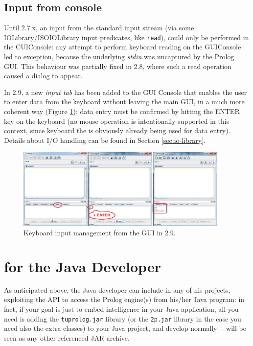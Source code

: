 \subsection{Input from console}
\label{ssec:input-from-console}

Until \tuprolog{} 2.7.x, an input from the standard input stream (via some IOLibrary/ISOIOLibrary input predicates, like \texttt{read}), could only be performed in the CUIConsole: any attempt to perform keyboard reading on the GUIConsole led to exception, because the underlying \emph{stdin} was uncaptured by the Prolog GUI.
This behaviour was partially fixed in \tuprolog{} 2.8, where such a read operation caused a dialog to appear. 

In \tuprolog{} 2.9, a new \textit{input tab} has been added to the GUI Console that enables the user to enter data from the keyboard without leaving the main GUI, in a much more coherent way (Figure \ref{fig:gui-InputFromConsole}): data entry must be confirmed by hitting the ENTER key on the keyboard (no mouse operation is intentionally supported in this context, since keyboard the is obviously already being used for data entry). Details about I/O handling can be found in Section \ref{sec:io-library}.

\begin{figure}
\centering
  \includegraphics[width=10.5cm]{images/gui-InputFromConsole.png}
  \caption{Keyboard input management from the GUI in \tuprolog{} 2.9.}\label{fig:gui-InputFromConsole}
\end{figure}

\section{\tuprolog{} for the Java Developer}
\label{sec:java-user-perspective}

As anticipated above, the Java developer can include \tuprolog{} in any of his projects, exploiting the \tuprolog{} API to access the Prolog engine(s) from his/her Java program: in fact, if your goal is just to embed intelligence in your Java application, all you need is adding the \texttt{tuprolog.jar} library (or the \texttt{2p.jar} library in the case you need also the extra classes) to your Java project, and develop normally---\tuprolog{} will be seen as any other referenced JAR archive.

